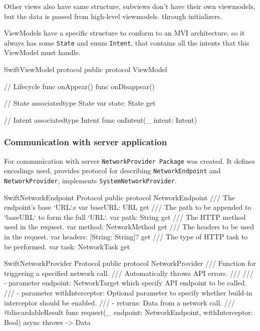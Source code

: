 \documentclass[
  biblatex,
  language=english,
  figures=false,
  sourcecodes,
  glossaries,
  index
]{kidiplom}
\begin{document}
Other views also have same structure, subviews don't have their own viewmodels, but the data is passed from high-level viewmodels. through initializers.

ViewModels have a specific structure to conform to an MVI architecture, so it always has some \texttt{State} and enum \texttt{Intent}, that contains all the intents that this ViewModel must handle.

\begin{kicode}{Swift}{}{ViewModel protocol}
public protocol ViewModel {
    // Lifecycle
    func onAppear()
    func onDisappear()
    
    // State
    associatedtype State
    var state: State { get }
    
    // Intent
    associatedtype Intent
    func onIntent(_ intent: Intent)
}
\end{kicode}

\subsubsection{Communication with server application}
For communication with server \texttt{NetworkProvider Package} was created. It defines encodings used, provides protocol for describing \texttt{NetworkEndpoint} and \texttt{NetworkProvider}, implements \texttt{SystemNetworkProvider}.

\begin{kicode}{Swift}{}{NetworkEndpoint Protocol}
public protocol NetworkEndpoint {
    /// The endpoint's base `URL`.s
    var baseURL: URL { get }
    /// The path to be appended to `baseURL` to form the full `URL`.
    var path: String { get }
    /// The HTTP method used in the request.
    var method: NetworkMethod { get }
    /// The headers to be used in the request.
    var headers: [String: String]? { get }
    /// The type of HTTP task to be performed.
    var task: NetworkTask { get }
}
\end{kicode}

\begin{kicode}{Swift}{}{NetworkProvider Protocol}
public protocol NetworkProvider {   
    /// Function for triggering a specified network call.
    /// Automatically throws API errors.
    ///
    /// - parameter endpoint: NetworkTarget which specify API endpoint to be called.
    /// - parameter withInterceptor: Optional parameter to specify whether build-in interceptor should be enabled.
    /// - returns: Data from a network call.
    ///
    @discardableResult
    func request(_ endpoint: NetworkEndpoint, withInterceptor: Bool) async throws -> Data
}
\end{kicode}
\end{document}
